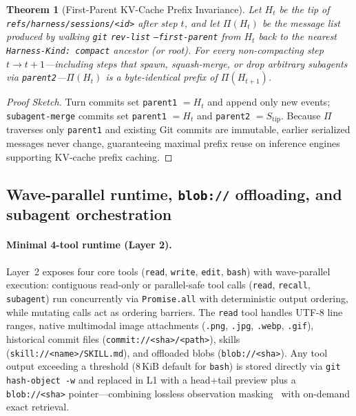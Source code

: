 \documentclass[11pt]{article}
\newcommand{\code}[1]{\nolinkurl{#1}}
\newtheorem{theorem}{Theorem}
\begin{document}
\begin{theorem}[First-Parent KV-Cache Prefix Invariance]
Let $H_t$ be the tip of \code{refs/harness/sessions/<id>} after step $t$, and let $\Pi(H_t)$ be the message list produced by walking \texttt{git} \texttt{rev-list} \texttt{--first-parent} from $H_t$ back to the nearest \texttt{Harness-Kind: compact} ancestor (or root). For every non-compacting step $t \to t+1$---including steps that spawn, squash-merge, or drop arbitrary subagents via \texttt{parent2}---$\Pi(H_t)$ is a byte-identical prefix of $\Pi(H_{t+1})$.
\end{theorem}

\begin{proof}[Proof Sketch]
Turn commits set \texttt{parent1} $= H_t$ and append only new events; \texttt{subagent-merge} commits set \texttt{parent1} $= H_t$ and \texttt{parent2} $= S_{\text{tip}}$. Because $\Pi$ traverses only \texttt{parent1} and existing Git commits are immutable, earlier serialized messages never change, guaranteeing maximal prefix reuse on inference engines supporting KV-cache prefix caching.
\end{proof}

\subsection{Wave-parallel runtime, \texttt{blob://} offloading, and subagent orchestration}
\label{sec:runtime-orch}
\paragraph{Minimal 4-tool runtime (Layer 2).}
Layer~2 exposes four core tools (\texttt{read}, \texttt{write}, \texttt{edit}, \texttt{bash}) with wave-parallel execution: contiguous read-only or parallel-safe tool calls (\texttt{read}, \texttt{recall}, \texttt{subagent}) run concurrently via \texttt{Promise.all} with deterministic output ordering, while mutating calls act as ordering barriers.
The \texttt{read} tool handles UTF-8 line ranges, native multimodal image attachments (\texttt{.png}, \texttt{.jpg}, \texttt{.webp}, \texttt{.gif}), historical commit files (\texttt{commit://<sha>/<path>}), skills (\texttt{skill://<name>/SKILL.md}), and offloaded blobs (\texttt{blob://<sha>}).
Any tool output exceeding a threshold ($8\,\mathrm{KiB}$ default for \texttt{bash}) is stored directly via \texttt{git hash-object -w} and replaced in L1 with a head+tail preview plus a \texttt{blob://<sha>} pointer---combining lossless observation masking~\citep{lindenbauer2025complexity} with on-demand exact retrieval.
\end{document}
